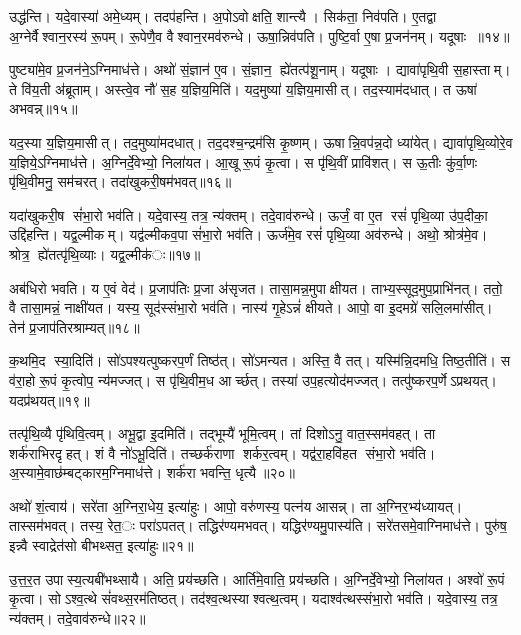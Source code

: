 उद्ध॑न्ति। यदे॒वास्या॑ अमे॒ध्यम्। तदप॑हन्ति। अ॒पोऽवोक्षति॒ शान्त्यै। सिक॑ता॒ निव॑पति। ए॒तद्वा अ॒ग्नेर्वैश्वान॒रस्य॑ रू॒पम्। रू॒पेणै॒व वैश्वान॒रमव॑रुन्धे। ऊषा॒न्निव॑पति। पुष्टि॒र्वा ए॒षा प्र॒जन॑नम्। यदूषाः ॥१४॥

पुष्ट्या॑मे॒व प्र॒जन॑ने॒ऽग्निमाध॑त्ते। अथो॑ सं॒ज्ञान॑ ए॒व। सं॒ज्ञान॒ ह्ये॑तत्प॑शू॒नाम्। यदूषाः। द्यावा॑पृथि॒वी स॒हास्ताम्। ते वि॑य॒ती अ॑ब्रूताम्। अस्त्वे॒व नौ॑ स॒ह य॒ज्ञिय॒मिति॑। यद॒मुष्या॑ य॒ज्ञिय॒मासीत्। तद॒स्याम॑दधात्। त ऊषा॑ अभवन्न्॥१५॥

यद॒स्या य॒ज्ञिय॒मासीत्। तद॒मुष्या॑मदधात्। तद॒दश्च॒न्द्रम॑सि कृ॒ष्णम्। ऊषान्नि॒वप॑न्न॒दो ध्या॑येत्। द्यावा॑पृथि॒व्योरे॒व य॒ज्ञिये॒ऽग्निमाध॑त्ते। अ॒ग्निर्दे॒वेभ्यो॒ निला॑यत। आ॒खू रू॒पं कृ॒त्वा। स पृ॑थि॒वीं प्रावि॑शत्। स ऊ॒तीः कु॑र्वा॒णः पृ॑थि॒वीमनु॒ सम॑चरत्। तदा॑खुकरी॒षम॑भवत्॥१६॥

यदा॑खुकरी॒ष सं॑भा॒रो भव॑ति। यदे॒वास्य॒ तत्र॒ न्य॑क्तम्। तदे॒वाव॑रुन्धे। ऊर्जं॒ वा ए॒त रसं॑ पृथि॒व्या उ॑प॒दीका॒ उद्दि॑हन्ति। यद्व॒ल्मीकम्। यद्व॑ल्मीकव॒पा सं॑भा॒रो भव॑ति। ऊर्ज॑मे॒व रसं॑ पृथि॒व्या अव॑रुन्धे। अथो॒ श्रोत्र॑मे॒व। श्रोत्र॒ ह्ये॑तत्पृ॑थि॒व्याः। यद्व॒ल्मीक॑ः॥१७॥

अब॑धिरो भवति। य ए॒वं वेद॑। प्र॒जाप॑तिः प्र॒जा अ॑सृजत। तासा॒मन्न॒मुपाक्षीयत। ताभ्य॒स्सूद॒मुप॒प्राभि॑नत्। ततो॒ वै तासा॒मन्नं॒ नाक्षी॑यत। यस्य॒ सूद॑स्संभा॒रो भव॑ति। नास्य॑ गृ॒हेऽन्नं॑ क्षीयते। आपो॒ वा इ॒दमग्रे॑ सलि॒लमा॑सीत्। तेन॑ प्र॒जाप॑तिरश्राम्यत्॥१८॥

क॒थमि॒द स्या॒दिति॑। सो॑ऽपश्यत्पुष्करप॒र्णं तिष्ठ॑त्। सो॑ऽमन्यत। अस्ति॒ वै तत्। यस्मि॑न्नि॒दमधि॒ तिष्ठ॒तीति॑। स व॑रा॒हो रू॒पं कृ॒त्वोप॒ न्य॑मज्जत्। स पृ॑थि॒वीम॒ध आर्च्छत्। तस्या॑ उप॒हत्योद॑मज्जत्। तत्पु॑ष्करप॒र्णेऽप्रथयत्। यदप्र॑थयत्॥१९॥

तत्पृ॑थि॒व्यै पृ॑थिवि॒त्वम्। अभू॒द्वा इ॒दमिति॑। तद्भूम्यै॑ भूमि॒त्वम्। तां दिशोऽनु॒ वात॒स्सम॑वहत्। ता शर्क॑राभिरदृहत्। शं वै नो॑ऽभू॒दिति॑। तच्छर्क॑राणा शर्कर॒त्वम्। यद्व॑रा॒हवि॑हत संभा॒रो भव॑ति। अ॒स्यामे॒वाछ॑म्बट्कारम॒ग्निमाध॑त्ते। शर्क॑रा भवन्ति॒ धृत्यै॥२०॥

अथो॑ शं॒त्वाय॑। सरे॑ता अ॒ग्निरा॒धेय॒ इत्या॑हुः। आपो॒ वरु॑णस्य॒ पत्न॑य आसन्न्। ता अ॒ग्निर॒भ्य॑ध्यायत्। तास्सम॑भवत्। तस्य॒ रेत॒ः परा॑ऽपतत्। तद्धिर॑ण्यमभवत्। यद्धिर॑ण्यमु॒पास्य॑ति। सरे॑तसमे॒वाग्निमाध॑त्ते। पुरु॑ष॒ इन्न्वै स्वाद्रेत॑सो बीभथ्सत॒ इत्या॑हुः॥२१॥

उ॒त्त॒र॒त उपास्य॒त्यबी॑भथ्सायै। अति॒ प्रय॑च्छति। आर्ति॑मे॒वाति॒ प्रय॑च्छति। अ॒ग्निर्दे॒वेभ्यो॒ निला॑यत। अश्वो॑ रू॒पं कृ॒त्वा। सोऽश्व॒त्थे सं॑वथ्स॒रम॑तिष्ठत्। तद॑श्व॒त्थस्याश्वत्थ॒त्वम्। यदाश्व॑त्थस्संभा॒रो भव॑ति। यदे॒वास्य॒ तत्र॒ न्य॑क्तम्। तदे॒वाव॑रुन्धे॥२२॥

